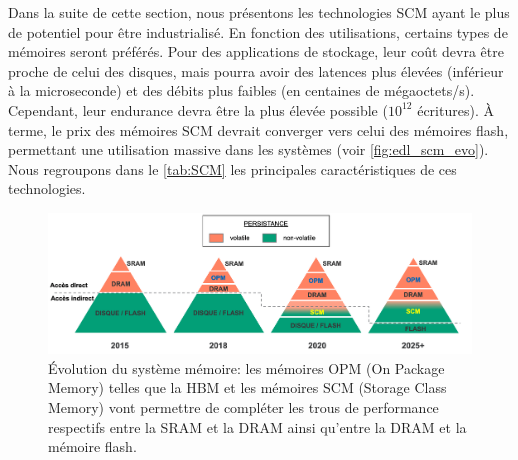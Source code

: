         
        Dans la suite de cette section, nous présentons les technologies SCM ayant le plus de potentiel pour être industrialisé. En fonction des utilisations, certains types de mémoires seront préférés. Pour des applications de stockage, leur coût devra être proche de celui des disques, mais pourra avoir des latences plus élevées (inférieur à la microseconde) et des débits plus faibles (en centaines de mégaoctets/s). Cependant, leur endurance devra être la plus élevée possible ($10^{12}$ écritures). À terme, le prix des mémoires SCM devrait converger vers celui des mémoires flash, permettant une utilisation massive dans les systèmes (voir \autoref{fig:edl_scm_evo}). Nous regroupons dans le \autoref{tab:SCM} les principales caractéristiques de ces technologies.
        
        
        \begin{figure}
        \center
        \includegraphics[width=17cm]{images/edl_scm_evo.png}
        \caption{\label{fig:edl_scm_evo} Évolution du système mémoire: les mémoires OPM (On Package Memory) telles que la HBM et les mémoires SCM (Storage Class Memory) vont permettre de compléter les trous de performance respectifs entre la SRAM et la DRAM ainsi qu'entre la DRAM et la mémoire flash.}
        \end{figure}
        

